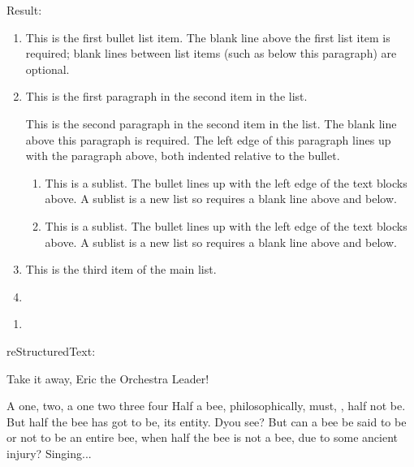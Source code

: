 \documentclass[letterpaper,12pt,english]{sphinxmanual}
\begin{document}
Result:
\begin{enumerate}
\def\theenumi{\arabic{enumi}}
\def\labelenumi{\theenumi .}
\makeatletter\def\p@enumii{\p@enumi \theenumi .}\makeatother
\item {} 
This is the first bullet list item.  The blank line above the
first list item is required; blank lines between list items
(such as below this paragraph) are optional.

\item {} 
This is the first paragraph in the second item in the list.

This is the second paragraph in the second item in the list.
The blank line above this paragraph is required.  The left edge
of this paragraph lines up with the paragraph above, both
indented relative to the bullet.
\begin{enumerate}
\def\theenumii{\alph{enumii}}
\def\labelenumii{\theenumii .}
\makeatletter\def\p@enumiii{\p@enumii \theenumii .}\makeatother
\item {} 
This is a sublist.  The bullet lines up with the left edge of
the text blocks above.  A sublist is a new list so requires a
blank line above and below.

\item {} 
This is a sublist.  The bullet lines up with the left edge of
the text blocks above.  A sublist is a new list so requires a
blank line above and below.

\end{enumerate}

\item {} 
This is the third item of the main list.

\item {} 

\end{enumerate}
\begin{enumerate}
\def\theenumi{\alph{enumi}}
\def\labelenumi{\theenumi .}
\makeatletter\def\p@enumii{\p@enumi \theenumi .}\makeatother
\item {} 

\end{enumerate}

reStructuredText:

\begin{sphinxVerbatim}[commandchars=\\\{\}]
Take it away, Eric the Orchestra Leader!

     A one, two, a one two three four
    \textbar{}
     Half a bee, philosophically,
         must, , half not be.
     But half the bee has got to be,
          its entity.  D\PYGZsq{}you see?
    \textbar{}
     But can a bee be said to be
         or not to be an entire bee,
             when half the bee is not a bee,
                 due to some ancient injury?
    \textbar{}
     Singing...
\end{sphinxVerbatim}
\end{document}
